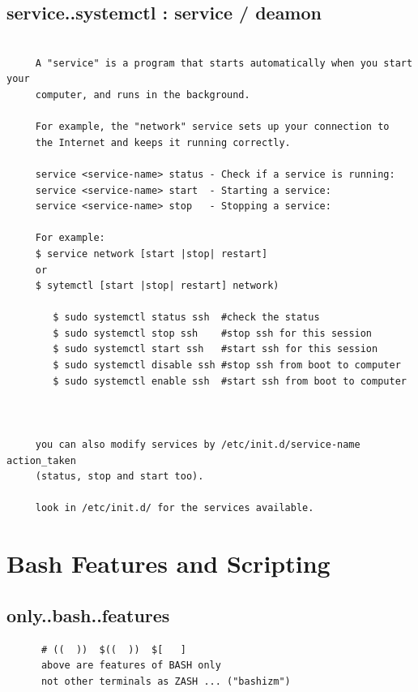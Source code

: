 \documentclass[a4paper,12pt]{article}
\begin{document}
\subsection{service..systemctl : service / deamon }
\begin{verbatim}

     A "service" is a program that starts automatically when you start your  
     computer, and runs in the background.
     
     For example, the "network" service sets up your connection to
     the Internet and keeps it running correctly.
     
     service <service-name> status - Check if a service is running:
     service <service-name> start  - Starting a service:
     service <service-name> stop   - Stopping a service:
     
     For example:
     $ service network [start |stop| restart]
     or
     $ sytemctl [start |stop| restart] network)
     
        $ sudo systemctl status ssh  #check the status
        $ sudo systemctl stop ssh    #stop ssh for this session
        $ sudo systemctl start ssh   #start ssh for this session
        $ sudo systemctl disable ssh #stop ssh from boot to computer
        $ sudo systemctl enable ssh  #start ssh from boot to computer   
     
     
     
     you can also modify services by /etc/init.d/service-name action_taken    
     (status, stop and start too).
     
     look in /etc/init.d/ for the services available.
\end{verbatim}

\section{Bash Features and Scripting}


\subsection{only..bash..features }
\begin{verbatim}
      # ((  ))  $((  ))  $[   ]
      above are features of BASH only 
      not other terminals as ZASH ... ("bashizm")

\end{verbatim}
\end{document}
